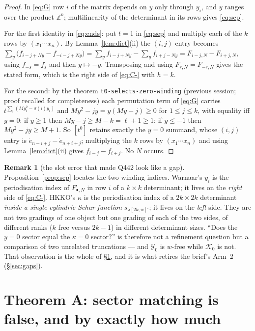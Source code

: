 \documentclass[11pt]{article}
\theoremstyle{plain}
\theoremstyle{definition}
\newtheorem{remark}[theorem]{Remark}
\newcommand{\edot}{\dot{e}}
\newcommand{\Z}{\mathbb{Z}}
\begin{document}
\begin{proof}
In \eqref{eq:G} row $i$ of the matrix depends on $y$ only through $y_i$, and
$y$ ranges over the product $\Z^k$; multilinearity of the determinant in its rows gives
\eqref{eq:sep}.

For the first identity in \eqref{eq:ends}: put $t=1$ in \eqref{eq:sep} and multiply each of
the $k$ rows by $(x_1\cdots x_n)$.  By Lemma~\ref{lem:dict}(ii) the $(i,j)$ entry becomes
$\sum_{y}\bigl(f_{i-j+Ny}-f_{-i-j+Ny}\bigr)
 =\sum_yf_{i-j+Ny}-\sum_yf_{i+j-Ny}=F_{i-j,N}-F_{i+j,N}$,
using $f_{-s}=f_s$ and then $y\mapsto-y$.  Transposing and using $F_{r,N}=F_{-r,N}$ gives
the stated form, which is the right side of \eqref{eq:C-} with $h=k$.

For the second: by the theorem \texttt{t0-selects-zero-winding} (previous session; proof
recalled for completeness) each permutation term of \eqref{eq:G} carries
$t^{\sum_i(My_i^2-\sigma(i)y_i)}$ and $My^2-jy=y(My-j)\ge0$ for $1\le j\le k$, with
equality iff $y=0$: if $y\ge1$ then $My-j\ge M-k=\ell+1\ge1$; if $y\le-1$ then
$My^2-jy\ge M+1$.  So $[t^0]$ retains exactly the $y=0$ summand, whose $(i,j)$ entry is
$\edot_{n-i+j}-\edot_{n+i+j}$; multiplying the $k$ rows by $(x_1\cdots x_n)$ and using
Lemma~\ref{lem:dict}(ii) gives $f_{i-j}-f_{i+j}$.  No $N$ occurs.
\end{proof}

\begin{remark}[the slot error that made Q442 look like a gap]\label{rem:slots}
Proposition~\ref{prop:sep} locates the two winding indices.  Warnaar's $y_i$ is the
periodisation index of $F_{\bullet,N}$ in row $i$ of a $k\times k$ determinant; it lives on
the \emph{right} side of \eqref{eq:C-}.  HKKO's $\kappa$ is the periodisation index of a
$2k\times 2k$ determinant \emph{inside a single cylindric Schur function}
$s_{\lambda[2k,w]'}$; it lives on the \emph{left} side.  They are not two gradings of one
object but one grading of each of the two sides, of different ranks ($k$ free versus
$2k-1$) in different determinant sizes.  ``Does the $y=0$ sector equal the $\kappa=0$
sector?'' is therefore not a refinement question but a comparison of two unrelated
truncations --- and $\mathcal Y_0$ is $w$-free while $\mathcal K_0$ is not.  That
observation is the whole of \S\ref{sec:A}, and it is what retires the brief's Arm~2
(\S\ref{sec:gaps}).
\end{remark}

\section{Theorem A: sector matching is false, and by exactly how much}\label{sec:A}
\end{document}
